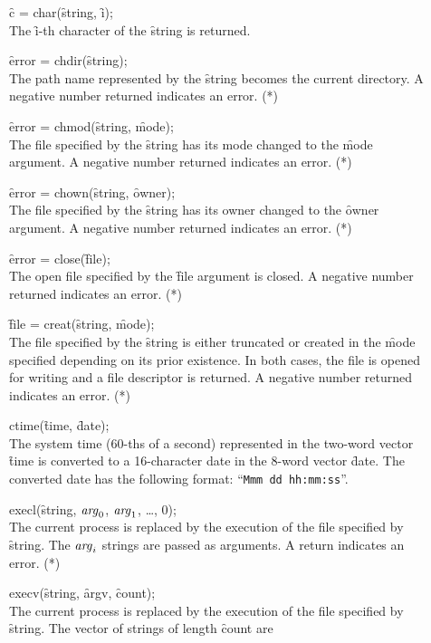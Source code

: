 \documentclass[12pt]{report}
\begin{document}
\begin{description}
\item[]\f{c} = char(\f{string}, \f{i});\hfill\\
  The \f{i}-th character of the \f{string} is returned.
\item[]\f{error} = chdir(\f{string});\hfill\\
  The path name represented by the \f{string} becomes the current
  directory. A negative number returned indicates an error. (*)
\item[]\f{error} = chmod(\f{string}, \f{mode});\hfill\\
  The file specified by the \f{string} has its mode changed to the \f{mode}
  argument. A negative number returned indicates an error. (*)
\item[]\f{error} = chown(\f{string}, \f{owner}); \hfill\\
  The file specified by the \f{string} has its owner changed to the \f{owner}
  argument. A negative number returned indicates an error. (*)
\item[]\f{error} = close(\f{file}); \hfill\\
  The open file specified by the \f{file} argument is closed. A negative
  number returned indicates an error. (*)
\item[]\f{file} = creat(\f{string}, \f{mode}); \hfill\\
  The file specified by the \f{string} is either truncated or created in
  the \f{mode} specified depending on its prior existence. In both cases,
  the file is opened for writing and a file descriptor is returned. A
  negative number returned indicates an error. (*)
\item[]ctime(\f{time}, \f{date}); \hfill\\
  The system time (60-ths of a second) represented in the two-word
  vector \f{time} is converted to a 16-character date in the 8-word
  vector \f{date}. The converted date has the following format:
  ``\verb|Mmm dd hh:mm:ss|''.
\item[]execl(\f{string}, $\mathit{arg}_0$, $\mathit{arg}_1$, \ldots, 0); \hfill\\
  The current process is replaced by the execution of the file
  specified by \f{string}. The $\mathit{arg}_i$ strings are passed as arguments. A
  return indicates an error. (*)
\item[]execv(\f{string}, \f{argv}, \f{count}); \hfill\\
  The current process is replaced by the execution of the file
  specified by \f{string}. The vector of strings of length \f{count} are

\end{description}
\end{document}
